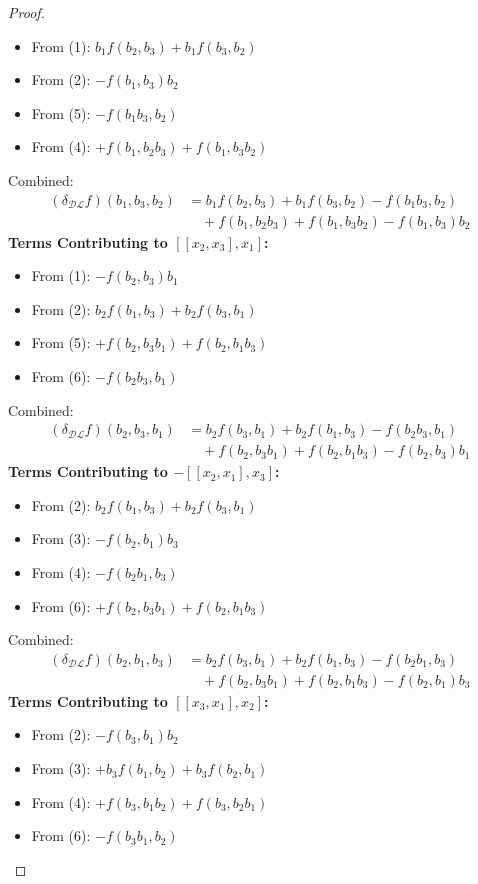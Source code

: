 \documentclass[10pt,a4paper]{amsart}
\newcommand{\DL}{\mathcal{DL}}
\begin{document}
\begin{proof}
\begin{itemize}
\item From (1): $b_1f(b_2,b_3)+b_1f(b_3,b_2)$
\item From (2): $-f(b_1, b_3)b_2$
\item From (5): $-f(b_1b_3, b_2)$
\item From (4): $+f(b_1,b_2b_3)+f(b_1,b_3b_2)$
\end{itemize}
Combined:
\begin{align*}
(\delta_{\DL} f)(b_1, b_3, b_2) &= b_1f(b_2,b_3)+b_1 f(b_3,b_2) - f(b_1  b_3, b_2) \\
&\quad + f(b_1, b_2  b_3) + f(b_1, b_3  b_2) - f(b_1,b_3)  b_2
\end{align*}
\textbf{Terms Contributing to $[[x_2,x_3],x_1]$:}
\begin{itemize}
\item From (1): $-f(b_2,  b_3)b_1$ 
\item From (2):  $  b_2f(b_1,b_3)+b_2f(b_3,b_1)$
\item From (5): $+f(b_2, b_3  b_1)+f(b_2,b_1b_3)$
\item From (6): $-f(b_2b_3,b_1)$
\end{itemize}
Combined:
\begin{align*}
(\delta_{\DL} f)(b_2, b_3, b_1) &= b_2f(b_3,b_1)+b_2 f(b_1,b_3) - f(b_2  b_3, b_1) \\
&\quad + f(b_2, b_3  b_1) + f(b_2, b_1  b_3) - f(b_2,b_3)  b_1
\end{align*}
\textbf{Terms Contributing to $-[[x_2,x_1],x_3]$:}
\begin{itemize}
\item From (2): $b_2f(b_1,  b_3)+b_2f(b_3,b_1)$ 
\item From (3):  $ - f(b_2,b_1)b_3$
\item From (4): $-f(b_2b_1, b_3 )$
\item From (6): $+f(b_2,b_3b_1)+f(b_2,b_1b_3)$
\end{itemize}
Combined:
\begin{align*}
(\delta_{\DL} f)(b_2, b_1, b_3) &= b_2f(b_3,b_1)+b_2 f(b_1,b_3) - f(b_2  b_1, b_3) \\
&\quad + f(b_2, b_3  b_1) + f(b_2, b_1  b_3) - f(b_2,b_1)  b_3
\end{align*}
\textbf{Terms Contributing to $[[x_3,x_1],x_2]$:}

\begin{itemize}
\item From (2): $-f(b_3,b_1)b_2$
\item From (3): $+b_3f(b_1, b_2)+b_3f(b_2,b_1)$
\item From (4): $+f(b_3,b_1b_2)+f(b_3,b_2b_1)$ 
\item From (6): $-f(b_3b_1,b_2)$
\end{itemize}


\end{proof}
\end{document}

